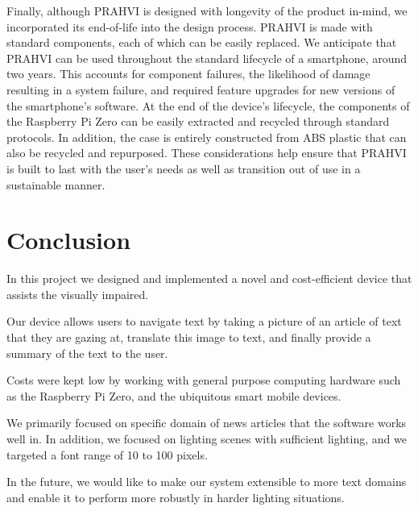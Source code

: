 	Finally, although PRAHVI is designed with longevity of the product in-mind, we incorporated its end-of-life into the design process. PRAHVI is made with standard components, each of which can be easily replaced. We anticipate that PRAHVI can be used throughout the standard lifecycle of a smartphone, around two years. This accounts for component failures, the likelihood of damage resulting in a system failure, and required feature upgrades for new versions of the smartphone's software. At the end of the device's lifecycle, the components of the Raspberry Pi Zero can be easily extracted and recycled through standard protocols. In addition, the case is entirely constructed from ABS plastic that can also be recycled and repurposed. These considerations help ensure that PRAHVI is built to last with the user's needs as well as transition out of use in a sustainable manner.

\chapter{Conclusion}
In this project we designed and implemented a novel and cost-efficient device that assists the visually impaired. 

Our device allows users to navigate text by taking a picture of an article of text that they are gazing at, translate this image to text, and finally provide a summary of the text to the user. 

Costs were kept low by working with general purpose computing hardware such as the Raspberry Pi Zero, and the ubiquitous smart mobile devices.

We primarily focused on specific domain of news articles that the software works well in. In addition, we focused on lighting scenes with sufficient lighting, and we targeted a font range of 10 to 100 pixels.

In the future, we would like to make our system extensible to more text domains and enable it to perform more robustly in harder lighting situations.